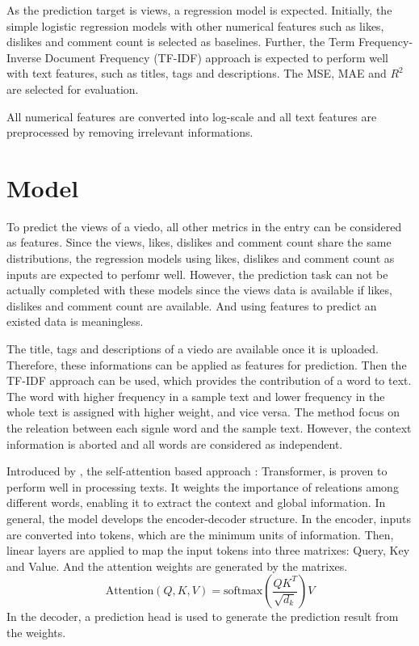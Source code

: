 \documentclass[sigplan,screen]{acmart}
\begin{document}
As the prediction target is views, a regression model is expected. Initially, the simple logistic regression models with other numerical features such as likes, dislikes and comment count is selected as baselines. Further, the Term Frequency-Inverse Document Frequency (TF-IDF) approach is expected to perform well with text features, such as titles, tags and descriptions. The MSE, MAE and $R^2$ are selected for evaluation.

All numerical features are converted into log-scale and all text features are preprocessed by removing irrelevant informations.



\section{Model}
To predict the views of a viedo, all other metrics in the entry can be considered as features. Since the views, likes, dislikes and comment count share the same distributions, the regression models using likes, dislikes and comment count as inputs are expected to perfomr well. However, the prediction task can not be actually completed with these models since the views data is available if likes, dislikes and comment count are available. And using features to predict an existed data is meaningless.

The title, tags and descriptions of a viedo are available once it is uploaded. Therefore, these informations can be applied as features for prediction. Then the TF-IDF approach can be used, which provides the contribution of a word to text. The word with higher frequency in a sample text and lower frequency in the whole text is assigned with higher weight, and vice versa. The method focus on the releation between each signle word and the sample text. However, the context information is aborted and all words are considered as independent.

Introduced by \cite{NIPS2017_3f5ee243}, the self-attention based approach : Transformer, is proven to perform well in processing texts. It weights the importance of releations among different words, enabling it to extract the context and global information. In general, the model develops the encoder-decoder structure. In the encoder, inputs are converted into tokens, which are the minimum units of information. Then, linear layers are applied to map the input tokens into three matrixes: Query, Key and Value. And the attention weights are generated by the matrixes.
\[
\text{Attention}(Q, K, V) = \text{softmax}\left(\frac{QK^T}{\sqrt{d_k}}\right)V
\]
In the decoder, a prediction head is used to generate the prediction result from the weights.
\end{document}

